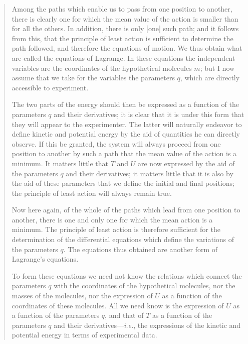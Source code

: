 \begin{quote}
    Among the paths which enable us to pass from one position to another, there is clearly one for which the mean value of the action is smaller than for all the others.  In addition, there is only [one] such path; and it follows from this, that the principle of least action is sufficient to determine the path followed, and therefore the equations of motion.  We thus obtain what are called the equations of Lagrange.  In these equations the independent variables are the coordinates of the hypothetical molecules $m$; but I now assume that we take for the variables the parameters $q$, which are directly accessible to experiment.
    
    The two parts of the energy should then be expressed as a function of the parameters $q$ and their derivatives; it is clear that it is under this form that they will appear to the experimenter.  The latter will naturally endeavor to define kinetic and potential energy by the aid of quantities he can directly observe.  If this be granted, the system will always proceed from one position to another by such a path that the mean value of the action is a minimum.  It matters little that $T$ and $U$ are now expressed by the aid of the parameters $q$ and their derivatives; it matters little that it is also by the aid of these parameters that we define the initial and final positions; the principle of least action will always remain true.
    
    Now here again, of the whole of the paths which lead from one position to another, there is one and only one for which the mean action is a minimum.  The principle of least action is therefore sufficient for the determination of the differential equations which define the variations of the parameters $q$.  The equations thus obtained are another form of Lagrange's equations.
    
    To form these equations we need not know the relations which connect the parameters $q$ with the coordinates of the hypothetical molecules, nor the masses of the molecules, nor the expression of $U$ as a function of the coordinates of these molecules.  All we need know is the expression of $U$ as a function of the parameters $q$, and that of $T$ as a function of the parameters $q$ and their derivatives---\emph{i.e.}, the expressions of the kinetic and potential energy in terms of experimental data.
    

\end{quote}
